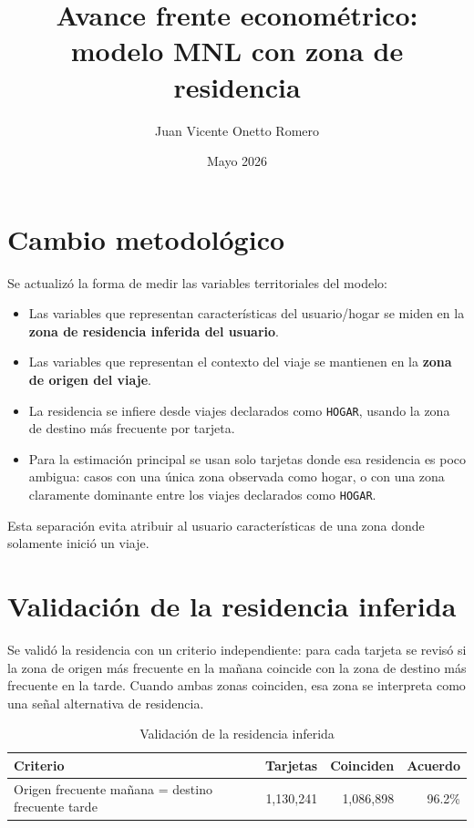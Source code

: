 \documentclass[11pt,letterpaper]{article}
\title{Avance frente econométrico: modelo MNL con zona de residencia}
\author{Juan Vicente Onetto Romero}
\date{Mayo 2026}
\begin{document}
\maketitle

\section{Cambio metodológico}

Se actualizó la forma de medir las variables territoriales del modelo:

\begin{itemize}
    \item Las variables que representan características del usuario/hogar se miden en la \textbf{zona de residencia inferida del usuario}.
    \item Las variables que representan el contexto del viaje se mantienen en la \textbf{zona de origen del viaje}.
    \item La residencia se infiere desde viajes declarados como \texttt{HOGAR}, usando la zona de destino más frecuente por tarjeta.
    \item Para la estimación principal se usan solo tarjetas donde esa residencia es poco ambigua: casos con una única zona observada como hogar, o con una zona claramente dominante entre los viajes declarados como \texttt{HOGAR}.
\end{itemize}

Esta separación evita atribuir al usuario características de una zona donde solamente inició un viaje.

\section{Validación de la residencia inferida}

Se validó la residencia con un criterio independiente: para cada tarjeta se revisó si la zona de origen más frecuente en la mañana coincide con la zona de destino más frecuente en la tarde. Cuando ambas zonas coinciden, esa zona se interpreta como una señal alternativa de residencia.

\begin{table}[htbp]
\centering
\caption{Validación de la residencia inferida}
\small
\setlength{\tabcolsep}{4pt}
\begin{tabularx}{\textwidth}{>{\raggedright\arraybackslash}X r r r}
\toprule
Criterio & Tarjetas & Coinciden & Acuerdo \\
\midrule
Origen frecuente mañana = destino frecuente tarde & 1,130,241 & 1,086,898 & 96.2\% \\
\bottomrule
\end{tabularx}
\end{table}
\end{document}
